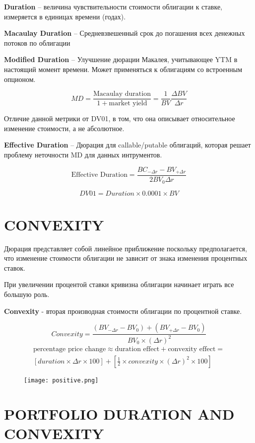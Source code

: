 \documentclass[a4paper,12pt]{article}
\begin{document}
\textbf{Duration} -- величина чувствительности стоимости облигации к ставке, измеряется в единицах времени (годах).

\textbf{Macaulay Duration} -- Средневзвешенный срок до погашения всех денежных потоков по облигации

\textbf{Modified Duration} -- Улучшение дюрации Макалея, учитывающее YTM в
настоящий момент времени. Может применяться к облигациям со встроенным опционом.


\[ MD = \frac{\text{Macaulay duration}}{1+ \text{market yield}} = \frac{1}{BV} \frac{\Delta BV}{\Delta r}   \]

Отличие данной метрики от DV01, в том, что она описывает относительное изменение стоимости, а не абсолютное.

\textbf{Effective Duration} -- Дюрация для callable/putable облигаций, которая решает проблему неточности MD для данных интрументов.

\[ \text{Effective Duration} = \frac{BC_{-\Delta r} - BV_{+\Delta r}}{2 BV_0 \Delta r} \]

\[DV01 = Duration \times 0.0001 \times BV\]

\section{CONVEXITY}

Дюрация представляет собой линейное приближение поскольку предполагается, что изменение стоимости облигации не зависит от знака изменения процентных ставок.

При увеличении процентой ставки кривизна облигации начинает играть все большую роль.

\textbf{Convexity} - вторая производная стоимости облигации по процентной ставке.

\[ Convexity = \frac{ (BV_{-\Delta r} - BV_0) + (BV_{+\Delta r} - BV_0)}{BV_0 \times (\Delta r)^2}  \]
\[
\begin{aligned} \text{percentage price change} \approx \text{duration effect} + \text{convexity effect} = \\ [duration \times \Delta r \times 100] + [\frac{1}{2} \times convexity \times (\Delta r)^2 \times 100] \end{aligned}
\]

\begin{figure}[h!]
    \texttt{[image: positive.png]}
    \caption{}\label{name1}
\end{figure}

\section{PORTFOLIO DURATION AND CONVEXITY}
\end{document}
